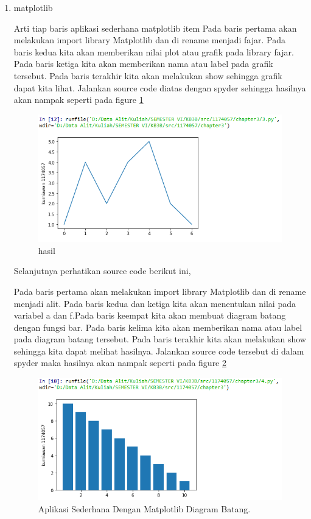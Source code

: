 \begin{enumerate}
\item matplotlib\par
Arti tiap baris aplikasi sederhana matplotlib item Pada baris pertama akan melakukan import library Matplotlib dan di rename menjadi fajar. Pada baris kedua kita akan memberikan nilai plot atau grafik  pada library fajar. Pada baris ketiga kita akan memberikan nama atau label pada grafik tersebut. Pada baris terakhir kita akan melakukan show sehingga grafik dapat kita lihat. Jalankan source code diatas dengan spyder sehingga hasilnya akan nampak seperti pada figure \ref{contoh3}

\begin{figure}[ht]
\centering
\includegraphics[scale=0.5]{figures/1174057/chapter3/6.PNG}
\caption{hasil}
\label{contoh3}
\end{figure}

\subitem Selanjutnya perhatikan source code berikut ini,

Pada baris pertama akan melakukan import library Matplotlib dan di rename menjadi alit. Pada baris kedua dan ketiga kita akan menentukan nilai pada variabel a dan f.Pada baris keempat kita akan membuat diagram batang dengan fungsi bar. Pada baris kelima kita akan memberikan nama atau label pada diagram batang tersebut. Pada baris terakhir kita akan melakukan show sehingga kita dapat melihat hasilnya. Jalankan source code tersebut di dalam spyder maka hasilnya akan nampak seperti pada figure \ref{contohlagi}
	
\begin{figure}[ht]
\centerline{\includegraphics[width=1\textwidth]{figures/1174057/chapter3/7.PNG}}
\caption{Aplikasi Sederhana Dengan Matplotlib Diagram Batang.}
\label{contohlagi}
\end{figure}


\end{enumerate}
